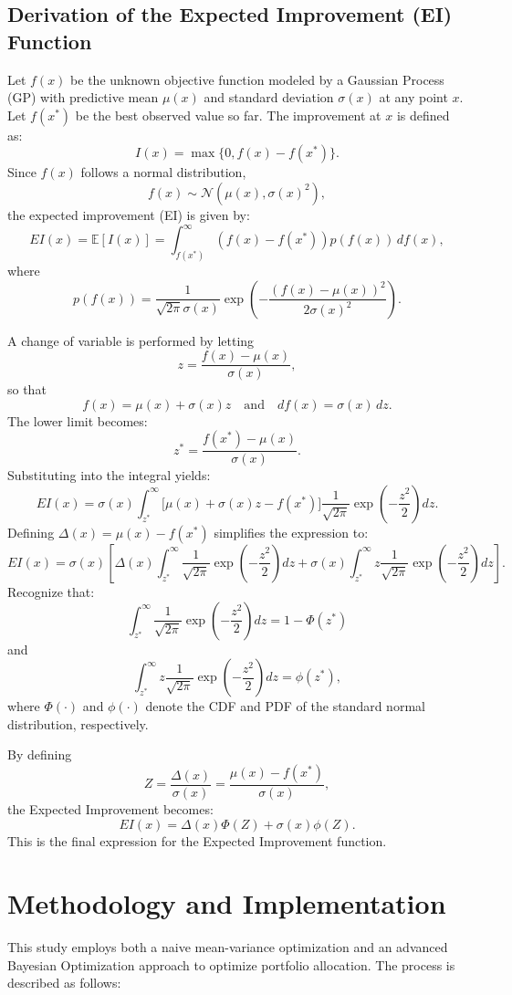 \documentclass[a4paper,12pt]{article}
\begin{document}
\subsection{Derivation of the Expected Improvement (EI) Function}
Let \( f(x) \) be the unknown objective function modeled by a Gaussian Process (GP) with predictive mean \( \mu(x) \) and standard deviation \( \sigma(x) \) at any point \( x \). Let \( f(x^*) \) be the best observed value so far. The improvement at \( x \) is defined as:
\[
I(x) = \max\{0, f(x) - f(x^*)\}.
\]
Since \( f(x) \) follows a normal distribution,
\[
f(x) \sim \mathcal{N}(\mu(x), \sigma(x)^2),
\]
the expected improvement (EI) is given by:
\[
EI(x) = \mathbb{E}[I(x)] = \int_{f(x^*)}^{\infty} \left( f(x) - f(x^*) \right) p(f(x)) \, df(x),
\]
where
\[
p(f(x)) = \frac{1}{\sqrt{2\pi}\sigma(x)} \exp\left( -\frac{(f(x) - \mu(x))^2}{2\sigma(x)^2} \right).
\]

A change of variable is performed by letting
\[
z = \frac{f(x) - \mu(x)}{\sigma(x)},
\]
so that
\[
f(x) = \mu(x) + \sigma(x)z \quad \text{and} \quad df(x) = \sigma(x) \, dz.
\]
The lower limit becomes:
\[
z^* = \frac{f(x^*) - \mu(x)}{\sigma(x)}.
\]
Substituting into the integral yields:
\[
EI(x) = \sigma(x) \int_{z^*}^{\infty} \Big[\mu(x) + \sigma(x)z - f(x^*)\Big] \frac{1}{\sqrt{2\pi}} \exp\left( -\frac{z^2}{2} \right) dz.
\]
Defining \( \Delta(x) = \mu(x) - f(x^*) \) simplifies the expression to:
\[
EI(x) = \sigma(x) \left[ \Delta(x) \int_{z^*}^{\infty} \frac{1}{\sqrt{2\pi}} \exp\left( -\frac{z^2}{2} \right) dz + \sigma(x) \int_{z^*}^{\infty} z \frac{1}{\sqrt{2\pi}} \exp\left( -\frac{z^2}{2} \right) dz \right].
\]
Recognize that:
\[
\int_{z^*}^{\infty} \frac{1}{\sqrt{2\pi}} \exp\left( -\frac{z^2}{2} \right) dz = 1 - \Phi(z^*)
\]
and
\[
\int_{z^*}^{\infty} z \frac{1}{\sqrt{2\pi}} \exp\left( -\frac{z^2}{2} \right) dz = \phi(z^*),
\]
where \( \Phi(\cdot) \) and \( \phi(\cdot) \) denote the CDF and PDF of the standard normal distribution, respectively.

By defining
\[
Z = \frac{\Delta(x)}{\sigma(x)} = \frac{\mu(x) - f(x^*)}{\sigma(x)},
\]
the Expected Improvement becomes:
\[
EI(x) = \Delta(x)\Phi(Z) + \sigma(x)\phi(Z).
\]
This is the final expression for the Expected Improvement function.

\section{Methodology and Implementation}
This study employs both a naive mean-variance optimization and an advanced Bayesian Optimization approach to optimize portfolio allocation. The process is described as follows:
\end{document}
